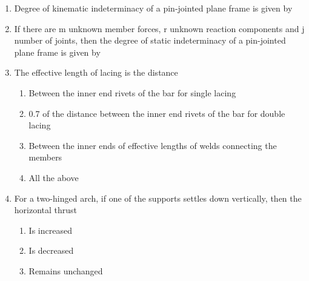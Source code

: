 \documentclass[11pt,a4paper]{article}
\begin{document}
\begin{enumerate}
\\
\item{Degree of kinematic indeterminacy of a pin-jointed plane frame is given by}
\\
\item{If there are m unknown member forces, r unknown reaction components and j number of joints, then the degree of static indeterminacy of a pin-jointed plane frame is given by}
\\
\item{The effective length of lacing is the distance}
\begin{enumerate}[label=\Alph*.]
\item{Between the inner end rivets of the bar for single lacing}
\item{0.7 of the distance between the inner end rivets of the bar for double lacing}
\item{Between the inner ends of effective lengths of welds connecting the members}
\item{All the above}
\end{enumerate}
\item{For a two-hinged arch, if one of the supports settles down vertically, then the horizontal thrust}
\begin{enumerate}[label=\Alph*.]
\item{Is increased}
\item{Is decreased}
\item{Remains unchanged}

\end{enumerate}
\end{enumerate}
\end{document}
